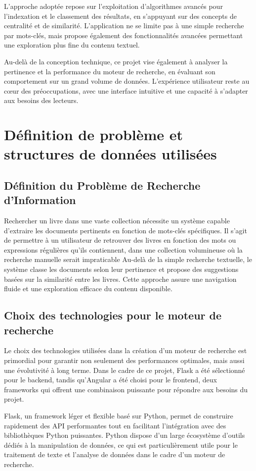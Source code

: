 \documentclass{article}
\begin{document}
L’approche adoptée repose sur l’exploitation d’algorithmes avancés pour l’indexation et le classement des résultats, en s’appuyant sur des concepts de centralité et de similarité. L’application ne se limite pas à une simple recherche par mots-clés, mais propose également des fonctionnalités avancées permettant une exploration plus fine du contenu textuel.

Au-delà de la conception technique, ce projet vise également à analyser la pertinence et la performance du moteur de recherche, en évaluant son comportement sur un grand volume de données. L’expérience utilisateur reste au cœur des préoccupations, avec une interface intuitive et une capacité à s’adapter aux besoins des lecteurs.
\section{Définition de problème et structures de données utilisées}
    \subsection{Définition du Problème de Recherche d'Information}
    Rechercher un livre dans une vaste collection nécessite un système capable d'extraire les documents pertinents en fonction de mots-clés spécifiques. Il s'agit de permettre à un utilisateur de retrouver des livres en fonction des mots ou expressions régulières qu'ils contiennent, dans une collection volumineuse où la recherche manuelle serait impraticable Au-delà de la simple recherche textuelle, le système classe les documents selon leur pertinence et propose des suggestions basées sur la similarité entre les livres. Cette approche assure une navigation fluide et une exploration efficace du contenu disponible.

    \subsection{Choix des technologies pour le moteur de recherche}
    Le choix des technologies utilisées dans la création d’un moteur de recherche est primordial pour garantir non seulement des performances optimales, mais aussi une évolutivité à long terme. Dans le cadre de ce projet, Flask a été sélectionné pour le backend, tandis qu’Angular a été choisi pour le frontend, deux frameworks qui offrent une combinaison puissante pour répondre aux besoins du projet.

    Flask, un framework léger et flexible basé sur Python, permet de construire rapidement des API performantes tout en facilitant l’intégration avec des bibliothèques Python puissantes. Python dispose d’un large écosystème d’outils dédiés à la manipulation de données, ce qui est particulièrement utile pour le traitement de texte et l’analyse de données dans le cadre d’un moteur de recherche. 
\end{document}
